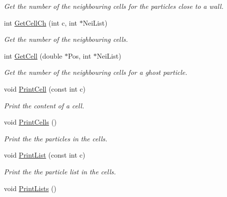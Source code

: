 \begin{DoxyCompactItemize}
\begin{DoxyCompactList}\small\item\em \-Get the number of the neighbouring cells for the particles close to a wall. \end{DoxyCompactList}\item 
int \hyperlink{classDomDecBasics_aa02df5ddcb998bf1a8f221f1bf14e063}{\-Get\-Cell\-Ch} (int c, int $\ast$\-Nei\-List)
\begin{DoxyCompactList}\small\item\em \-Get the number of the neighbouring cells. \end{DoxyCompactList}\item 
int \hyperlink{classDomDecBasics_a1d363b247b350543ea601e5f41a405eb}{\-Get\-Cell} (double $\ast$\-Pos, int $\ast$\-Nei\-List)
\begin{DoxyCompactList}\small\item\em \-Get the number of the neighbouring cells for a ghost particle. \end{DoxyCompactList}\item 
\hypertarget{classDomDecBasics_af5188eb0e6caae79f8bf349bf2345cf2}{void \hyperlink{classDomDecBasics_af5188eb0e6caae79f8bf349bf2345cf2}{\-Print\-Cell} (const int c)}\label{classDomDecBasics_af5188eb0e6caae79f8bf349bf2345cf2}

\begin{DoxyCompactList}\small\item\em \-Print the content of a cell. \end{DoxyCompactList}\item 
\hypertarget{classDomDecBasics_a1132024d8fdd721fd6a36781d4235162}{void \hyperlink{classDomDecBasics_a1132024d8fdd721fd6a36781d4235162}{\-Print\-Cells} ()}\label{classDomDecBasics_a1132024d8fdd721fd6a36781d4235162}

\begin{DoxyCompactList}\small\item\em \-Print the the particles in the cells. \end{DoxyCompactList}\item 
\hypertarget{classDomDecBasics_abacbda4ce7eed0eee33efe489157ff81}{void \hyperlink{classDomDecBasics_abacbda4ce7eed0eee33efe489157ff81}{\-Print\-List} (const int c)}\label{classDomDecBasics_abacbda4ce7eed0eee33efe489157ff81}

\begin{DoxyCompactList}\small\item\em \-Print the the particle list in the cells. \end{DoxyCompactList}\item 
\hypertarget{classDomDecBasics_aff89725be8d743f07f318ef0c06858e1}{void \hyperlink{classDomDecBasics_aff89725be8d743f07f318ef0c06858e1}{\-Print\-Lists} ()}\label{classDomDecBasics_aff89725be8d743f07f318ef0c06858e1}


\end{DoxyCompactItemize}
